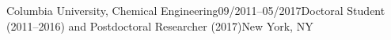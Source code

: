 \begin{rSubsection}{Columbia University, Chemical Engineering}{09/2011--05/2017}{Doctoral Student (2011--2016) and Postdoctoral Researcher (2017)}{New York, NY}
\end{rSubsection}